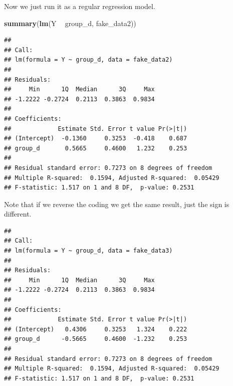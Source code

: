 \documentclass[]{book}
\newenvironment{Shaded}{\begin{snugshade}}{\end{snugshade}}
\newcommand{\DataTypeTok}[1]{\textcolor[rgb]{0.13,0.29,0.53}{#1}}
\newcommand{\DecValTok}[1]{\textcolor[rgb]{0.00,0.00,0.81}{#1}}
\newcommand{\KeywordTok}[1]{\textcolor[rgb]{0.13,0.29,0.53}{\textbf{#1}}}
\newcommand{\NormalTok}[1]{#1}
\newcommand{\OperatorTok}[1]{\textcolor[rgb]{0.81,0.36,0.00}{\textbf{#1}}}
\newcommand{\StringTok}[1]{\textcolor[rgb]{0.31,0.60,0.02}{#1}}
\begin{document}
Now we just run it as a regular regression model.

\begin{Shaded}
\begin{Highlighting}[]
\KeywordTok{summary}\NormalTok{(}\KeywordTok{lm}\NormalTok{(Y }\OperatorTok{~}\StringTok{ }\NormalTok{group_d, fake_data2))}
\end{Highlighting}
\end{Shaded}

\begin{verbatim}
## 
## Call:
## lm(formula = Y ~ group_d, data = fake_data2)
## 
## Residuals:
##     Min      1Q  Median      3Q     Max 
## -1.2222 -0.2724  0.2113  0.3863  0.9834 
## 
## Coefficients:
##             Estimate Std. Error t value Pr(>|t|)
## (Intercept)  -0.1360     0.3253  -0.418    0.687
## group_d       0.5665     0.4600   1.232    0.253
## 
## Residual standard error: 0.7273 on 8 degrees of freedom
## Multiple R-squared:  0.1594,	Adjusted R-squared:  0.05429 
## F-statistic: 1.517 on 1 and 8 DF,  p-value: 0.2531
\end{verbatim}

Note that if we reverse the coding we get the same result, just the sign is different.

\begin{Shaded}
\end{Shaded}

\begin{verbatim}
## 
## Call:
## lm(formula = Y ~ group_d, data = fake_data3)
## 
## Residuals:
##     Min      1Q  Median      3Q     Max 
## -1.2222 -0.2724  0.2113  0.3863  0.9834 
## 
## Coefficients:
##             Estimate Std. Error t value Pr(>|t|)
## (Intercept)   0.4306     0.3253   1.324    0.222
## group_d      -0.5665     0.4600  -1.232    0.253
## 
## Residual standard error: 0.7273 on 8 degrees of freedom
## Multiple R-squared:  0.1594,	Adjusted R-squared:  0.05429 
## F-statistic: 1.517 on 1 and 8 DF,  p-value: 0.2531
\end{verbatim}
\end{document}
